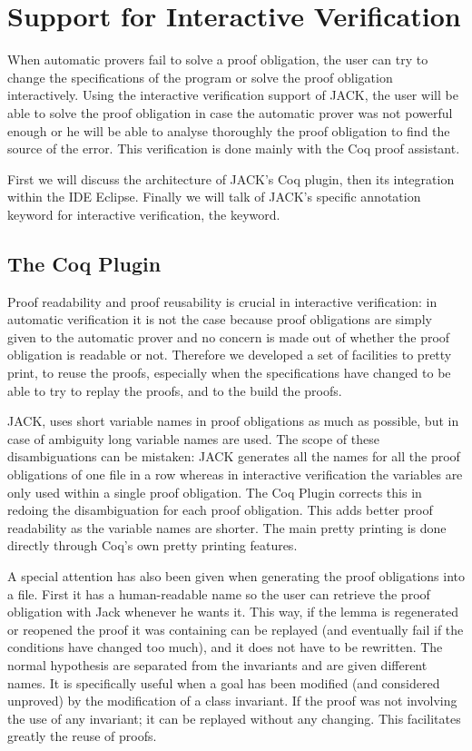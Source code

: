 


\section{Support for Interactive Verification}\label{SecInteractive}
When automatic provers fail to solve a proof obligation,
the user can try to change the specifications of the program or
 solve the proof obligation interactively.
Using the interactive verification support of JACK,
the user will be able to solve the proof obligation in case
the automatic prover was not powerful enough or he will be able to analyse 
thoroughly the proof obligation to find the source of the error.
This verification is done mainly with the Coq proof assistant. 

First we will discuss the architecture of JACK's Coq plugin, then its 
integration within the IDE Eclipse. Finally we will talk of
 JACK's specific annotation keyword for interactive verification, the 
\native keyword. 

\subsection{The Coq Plugin}
Proof readability and proof reusability is crucial in interactive 
verification: in automatic verification it is not the case because proof
obligations are simply given to the automatic prover and no concern is made
out of whether the proof obligation is readable or not.
Therefore we developed a set of facilities to
pretty print, to reuse the proofs, especially when the specifications 
have changed to be able to try to replay the proofs, and to the build the proofs.

JACK, uses short variable names in proof obligations as much as possible, 
but in case of ambiguity long variable names are used.
The scope of these disambiguations can be mistaken: JACK generates all 
the names for all the proof obligations of one file in a row whereas 
in interactive verification the variables are only 
used within a single proof obligation.
The Coq Plugin corrects this in redoing the disambiguation for each proof obligation.
This adds better proof readability as the variable names are shorter.
The main pretty printing is done directly through Coq's own pretty printing features. 


A special attention has also been given when generating the proof obligations 
into a file. First it has a human-readable name so the user can retrieve 
the proof obligation with Jack whenever he wants it. 
This way, if the lemma is regenerated or reopened
 the proof it was containing can be replayed 
(and eventually fail if the conditions have changed too much), and it does not have
to be rewritten.
The normal hypothesis are separated from the invariants and
are given different names.
It is specifically useful when a goal has been modified (and considered 
unproved) by the modification of a class invariant. If the proof was not involving
the use of any invariant; it can be replayed without any changing. This facilitates
greatly the reuse of proofs.


